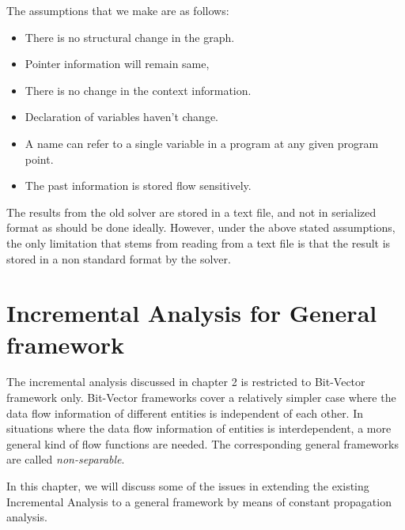 \documentclass[11pt,a4paper,openright]{report}
\begin{document}
The assumptions that we make are as follows:
\begin{itemize}
\item There is no structural change in the graph.
\item Pointer information will remain same,
\item There is no change in the context information.
\item Declaration of variables haven't change.
\item A name can refer to a single variable in a program at any given program point.
\item The past information is stored flow sensitively.
\end{itemize}


The results from the old solver are stored in a text file, and not in serialized format as should be done ideally.
However, under the above stated assumptions, the only limitation that stems from reading from a text file 
is that the result is stored in a non standard format by the solver.







\chapter{Incremental Analysis for General framework}
The incremental analysis discussed in chapter 2 is restricted to Bit-Vector framework only.
Bit-Vector frameworks cover a relatively simpler case where the data flow information of 
different entities is independent of each other. In situations where the data flow information
of entities is interdependent, a more general kind of flow functions are needed.
The corresponding general frameworks are called \emph{non-separable}.

In this chapter, we will discuss some of the issues in extending the existing Incremental 
Analysis to a general framework by means of constant propagation analysis.
\end{document}
